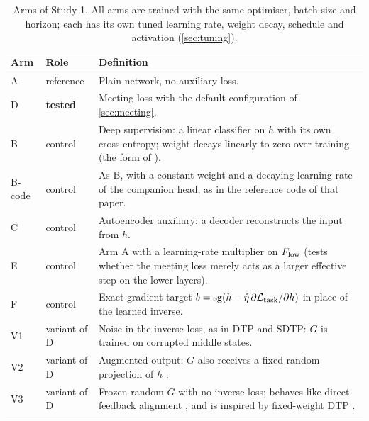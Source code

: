 \begin{table}[t]
\centering\small
\caption{Arms of Study 1. All arms are trained with the same optimiser, batch size and horizon; each has its own tuned learning rate, weight decay, schedule and activation (\cref{sec:tuning}).}
\label{tab:arms}
\begin{tabularx}{\textwidth}{@{}l l X@{}}
\toprule
Arm & Role & Definition\\
\midrule
A & reference & Plain network, no auxiliary loss.\\
D & \textbf{tested} & Meeting loss with the default configuration of \cref{sec:meeting}.\\
B & control & Deep supervision: a linear classifier on $h$ with its own cross-entropy; weight decays linearly to zero over training (the form of \citealt{lee2015deeply}).\\
B-code & control & As B, with a constant weight and a decaying learning rate of the companion head, as in the reference code of that paper.\\
C & control & Autoencoder auxiliary: a decoder reconstructs the input from $h$.\\
E & control & Arm A with a learning-rate multiplier on $F_{\mathrm{low}}$ (tests whether the meeting loss merely acts as a larger effective step on the lower layers).\\
F & control & Exact-gradient target $b=\mathrm{sg}(h-\hat\eta\,\partial\mathcal{L}_{\mathrm{task}}/\partial h)$ in place of the learned inverse.\\
V1 & variant of D & Noise in the inverse loss, as in DTP and SDTP: $G$ is trained on corrupted middle states.\\
V2 & variant of D & Augmented output: $G$ also receives a fixed random projection of $h$ \citep{bartunov2018assessing}.\\
V3 & variant of D & Frozen random $G$ with no inverse loss; behaves like direct feedback alignment \citep{nokland2016direct}, and is inspired by fixed-weight DTP \citep{shibuya2023fixed}.\\
\bottomrule
\end{tabularx}
\end{table}

